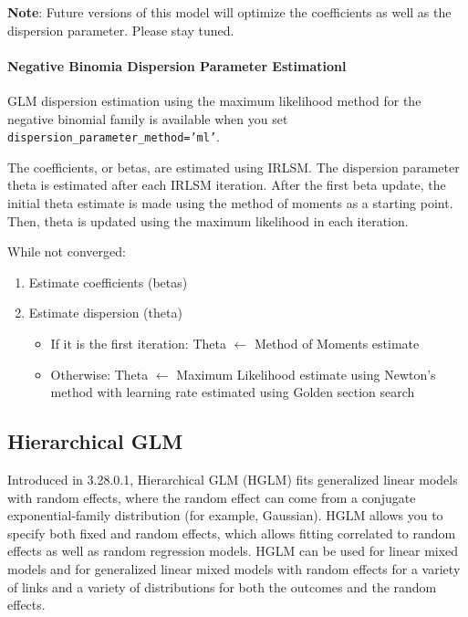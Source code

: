 \textbf{Note}: Future versions of this model will optimize the coefficients as well as the dispersion parameter. Please stay tuned.

\newpage
\waterExampleInR


\waterExampleInPython


\paragraph{Negative Binomia Dispersion Parameter Estimationl}

GLM dispersion estimation using the maximum likelihood method for the negative binomial family is available when you set \\
\texttt{dispersion\_parameter\_method='ml'}.

The coefficients, or betas, are estimated using IRLSM. The dispersion parameter theta is estimated after each IRLSM iteration. After the first beta update, the initial theta estimate is made using the method of moments as a starting point. Then, theta is updated using the maximum likelihood in each iteration.

While not converged:

\begin{enumerate}
\item Estimate coefficients (betas)
\item Estimate dispersion (theta)
\begin{itemize}
\item If it is the first iteration: Theta $\gets$ Method of Moments estimate
\item Otherwise: Theta $\gets$ Maximum Likelihood estimate using Newton's method with learning rate estimated using Golden section search
\end{itemize}
\end{enumerate}

\subsection{Hierarchical GLM}

Introduced in 3.28.0.1, Hierarchical GLM (HGLM) fits generalized linear models with random effects, where the random effect can come from a conjugate exponential-family distribution (for example, Gaussian). HGLM allows you to specify both fixed and random effects, which allows fitting correlated to random effects as well as random regression models. HGLM can be used for linear mixed models and for generalized linear mixed models with random effects for a variety of links and a variety of distributions for both the outcomes and the random effects.

